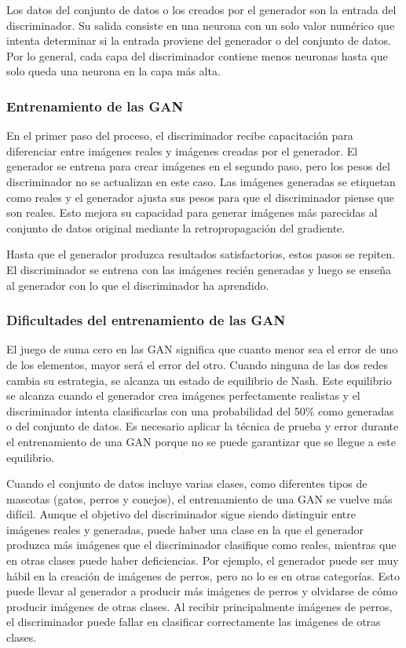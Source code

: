 Los datos del conjunto de datos o los creados por el generador son la entrada del discriminador. Su salida consiste en una neurona con un solo valor numérico que intenta determinar si la entrada proviene del generador o del conjunto de datos. Por lo general, cada capa del discriminador contiene menos neuronas hasta que solo queda una neurona en la capa más alta. \parencite{tec_goodfellow2014gan}

\subsubsection{Entrenamiento de las GAN}

En el primer paso del proceso, el discriminador recibe capacitación para diferenciar entre imágenes reales y imágenes creadas por el generador. El generador se entrena para crear imágenes en el segundo paso, pero los pesos del discriminador no se actualizan en este caso. Las imágenes generadas se etiquetan como reales y el generador ajusta sus pesos para que el discriminador piense que son reales. Esto mejora su capacidad para generar imágenes más parecidas al conjunto de datos original mediante la retropropagación del gradiente. \parencite{bk_geron2019machilear}

Hasta que el generador produzca resultados satisfactorios, estos pasos se repiten. El discriminador se entrena con las imágenes recién generadas y luego se enseña al generador con lo que el discriminador ha aprendido. \parencite{bk_geron2019machilear}

\subsubsection{Dificultades del entrenamiento de las GAN}

El juego de suma cero en las GAN significa que cuanto menor sea el error de uno de los elementos, mayor será el error del otro. Cuando ninguna de las dos redes cambia su estrategia, se alcanza un estado de equilibrio de Nash. Este equilibrio se alcanza cuando el generador crea imágenes perfectamente realistas y el discriminador intenta clasificarlas con una probabilidad del 50\% como generadas o del conjunto de datos. Es necesario aplicar la técnica de prueba y error durante el entrenamiento de una GAN porque no se puede garantizar que se llegue a este equilibrio. \parencite{bk_geron2019machilear}

Cuando el conjunto de datos incluye varias clases, como diferentes tipos de mascotas (gatos, perros y conejos), el entrenamiento de una GAN se vuelve más difícil. Aunque el objetivo del discriminador sigue siendo distinguir entre imágenes reales y generadas, puede haber una clase en la que el generador produzca más imágenes que el discriminador clasifique como reales, mientras que en otras clases puede haber deficiencias. Por ejemplo, el generador puede ser muy hábil en la creación de imágenes de perros, pero no lo es en otras categorías. Esto puede llevar al generador a producir más imágenes de perros y olvidarse de cómo producir imágenes de otras clases. Al recibir principalmente imágenes de perros, el discriminador puede fallar en clasificar correctamente las imágenes de otras clases. \parencite{bk_geron2019machilear}

